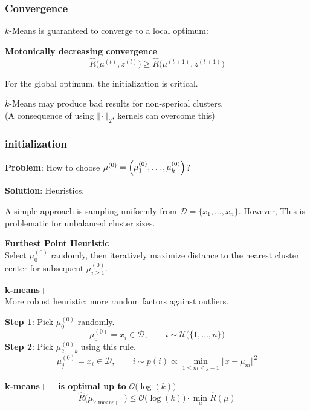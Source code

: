 \subsubsection{Convergence}

$k$-Means is guaranteed to converge to a local optimum:

\theorem \textbf{Motonically decreasing convergence}\\
$$
    \hat{R}\bigl( \mu^{(t)},z^{(t)} \bigr) \geq \hat{R}\bigl( \mu^{(t+1)},z^{(t+1)} \bigr)
$$

{\footnotesize
    \remark For the global optimum, the initialization is critical.
}

{\footnotesize
    \remark $k$-Means may produce bad results for non-sperical clusters.\\ 
    \color{gray}(A consequence of using $\Vert\cdot\Vert_2$, kernels can overcome this)
}

\subsubsection{initialization}

\textbf{Problem}: How to choose $\mu^{(0)} = \Bigl(\mu^{(0)}_1,\ldots,\mu^{(0)}_k  \Bigr)$?

\textbf{Solution}: Heuristics.

A simple approach is sampling uniformly from $\mathcal{D} = \{x_1,\ldots,x_n\}$. However, This is problematic for unbalanced cluster sizes.\\

\method \textbf{Furthest Point Heuristic}\\
Select $\mu^{(0)}_0$ randomly, then iteratively maximize distance to the nearest cluster center for subsequent $\mu^{(0)}_{i\geq1}$.

\method \textbf{k-means++}\\
More robust heuristic: more random factors against outliers.

\textbf{Step 1}: Pick $\mu^{(0)}_0$ randomly.
$$
    \mu^{(0)}_0 = x_i \in \mathcal{D}, \qquad i \sim \mathcal{U}\bigl(\{1,\ldots,n\}\bigr)
$$
\textbf{Step 2}: Pick $\mu^{(0)}_{2,\ldots,k}$ using this rule.
$$
    \mu^{(0)}_j = x_i \in \mathcal{D}, \qquad i \sim p(i) \propto \underset{1 \leq m \leq j-1}{\min}\bigl\Vert x-\mu_m \bigr\Vert^2
$$

\theorem \textbf{k-means++ is optimal up to} $\mathcal{O}\bigl(\log(k)\bigr)$
$$
    \hat{R}\bigl( \mu_\text{k-means++} \bigr) \leq \mathcal{O}\bigl(\log(k)\bigr)\cdot \underset{\mu}{\min} \hat{R}(\mu)
$$

